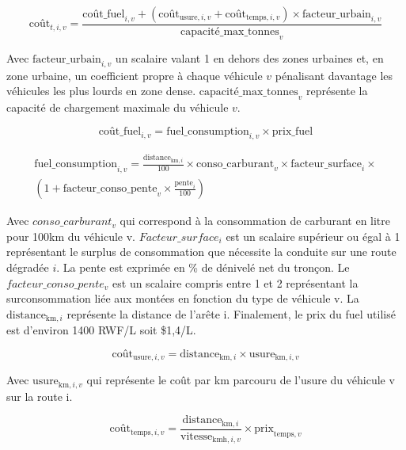 \documentclass[12pt,a4paper,french]{report}
\begin{document}
	\begin{equation}
		\text{coût}_{t,i,v} = \frac{ \text{coût\_fuel}_{i,v} + (\text{coût}_{\text{usure},i,v} + \text{coût}_{\text{temps},i,v}) \times \text{facteur\_urbain}_{i,v}}{\text{capacité\_max\_tonnes}_v}
		\label{eq:cout_t}
	\end{equation}

	Avec $\text{facteur\_urbain}_{i,v}$ un scalaire valant 1 en dehors des zones urbaines et, en zone urbaine, un coefficient propre à chaque véhicule $v$ pénalisant davantage les véhicules les plus lourds en zone dense. $\text{capacité\_max\_tonnes}_v$ représente la capacité de chargement maximale du véhicule $v$.


	\begin{equation}
		\text{coût\_fuel}_{i,v} = \text{fuel\_consumption}_{i,v} \times \text{prix\_fuel}
		\label{eq:cout_fuel}
	\end{equation}
	
	\begin{multline}
		\text{fuel\_consumption}_{i,v} = \frac{\text{distance}_{\text{km},i}}{100} \times 	\text{conso\_carburant}_v \times \text{facteur\_surface}_i \times {} \\
		\left(1 + \text{facteur\_conso\_pente}_v \times \frac{\text{pente}_i}{100}\right)
		\label{eq:fuel_consumption}
	\end{multline}
	
	Avec $conso\_carburant_v$ qui correspond à la consommation de carburant en litre pour 100km du véhicule v. $Facteur\_surface_i$ est un scalaire supérieur ou égal à 1 représentant le surplus de consommation que nécessite la conduite sur une route dégradée $i$. La pente est exprimée en \% de dénivelé net du tronçon. Le $facteur\_conso\_pente_v$ est un scalaire compris entre 1 et 2 représentant la surconsommation liée aux montées en fonction du type de véhicule v. La $\text{distance}_{\text{km},i}$ représente la distance de l'arête i. Finalement, le prix du fuel utilisé est d'environ 1400 RWF/L soit \$1,4/L.
	
	\begin{equation}
		\text{coût}_{\text{usure},i,v} = \text{distance}_{\text{km},i} \times \text{usure}_{\text{km},i,v}
		\label{eq:cout_usure}
	\end{equation}
	
	Avec $\text{usure}_{\text{km},i,v}$ qui représente le coût par km parcouru de l'usure du véhicule v sur la route i.
	
	\begin{equation}
		\text{coût}_{\text{temps},i,v} = \frac{\text{distance}_{\text{km},i}}{\text{vitesse}_{\text{kmh},i,v}} \times \text{prix}_{\text{temps},v}
		\label{eq:cout_temps}
	\end{equation}
\end{document}
